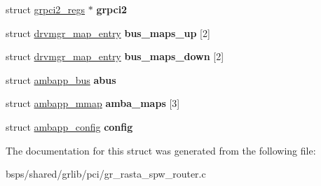 \begin{DoxyCompactItemize}
struct \mbox{\hyperlink{structgrpci2__regs}{grpci2\+\_\+regs}} $\ast$ {\bfseries grpci2}
\item 
\mbox{\label{structgr__rasta__spw__router__priv_a84e15ced42ebfc4bb6d2a35c8610c3d5}} 
struct \mbox{\hyperlink{structdrvmgr__map__entry}{drvmgr\+\_\+map\+\_\+entry}} {\bfseries bus\+\_\+maps\+\_\+up} \mbox{[}2\mbox{]}
\item 
\mbox{\label{structgr__rasta__spw__router__priv_a98582efba6790fc44c94d803e8284b94}} 
struct \mbox{\hyperlink{structdrvmgr__map__entry}{drvmgr\+\_\+map\+\_\+entry}} {\bfseries bus\+\_\+maps\+\_\+down} \mbox{[}2\mbox{]}
\item 
\mbox{\label{structgr__rasta__spw__router__priv_a55a3352d12a3217d930f841ac134a45e}} 
struct \mbox{\hyperlink{structambapp__bus}{ambapp\+\_\+bus}} {\bfseries abus}
\item 
\mbox{\label{structgr__rasta__spw__router__priv_ad2169ce28a1042c945146e3a1495aa9c}} 
struct \mbox{\hyperlink{structambapp__mmap}{ambapp\+\_\+mmap}} {\bfseries amba\+\_\+maps} \mbox{[}3\mbox{]}
\item 
\mbox{\label{structgr__rasta__spw__router__priv_af8190e6e0ffce6c112fbd525ce5195a4}} 
struct \mbox{\hyperlink{structambapp__config}{ambapp\+\_\+config}} {\bfseries config}
\end{DoxyCompactItemize}


The documentation for this struct was generated from the following file\+:\begin{DoxyCompactItemize}
\item 
bsps/shared/grlib/pci/gr\+\_\+rasta\+\_\+spw\+\_\+router.\+c\end{DoxyCompactItemize}
